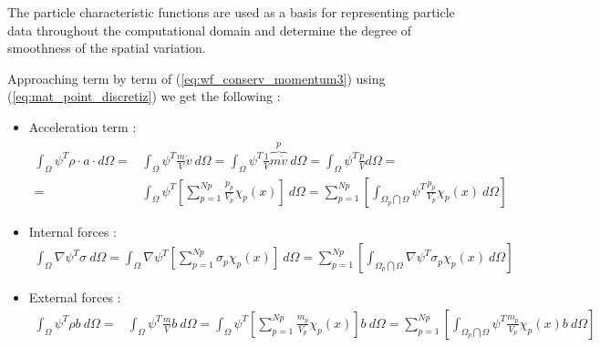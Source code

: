 The particle characteristic functions are used as a basis for
representing particle data throughout the computational domain and
determine the degree of smoothness of the spatial variation.

Approaching term by term of (\ref{eq:wf_conserv_momentum3}) using
(\ref{eq:mat_point_discretiz}) we get the following :



\begin{itemize}
\item Acceleration term :
  \begin{eqnarray}
    \label{eq:wf_conserv_momentum_acc}
   \int_{\Omega} \psi^T \rho \cdot a \cdot d\Omega =& \int_{\Omega} \psi^T \frac{m}{V}
                                                     \dot{v}\ d\Omega = \int_{\Omega} \psi^T \frac{1}{V}
                                                     \overbrace{m\dot{v}}^{\dot{p}}\ d\Omega = \int_{\Omega} \psi^T \frac{\dot{p}}{V} d\Omega = \nonumber \\
  =&  \int_{\Omega} \psi^T \left[ \sum^{Np}_{p=1} \frac{\dot{p}_p}{V_p} \chi_p(x) \right]\ d\Omega =
     \sum^{Np}_{p=1} \left[ \int_{\Omega_p \bigcap \Omega}
     \psi^T\frac{\dot{p}_p}{V_p}\chi_p(x)\ d\Omega \right] 
  \end{eqnarray}


\item Internal forces :
  \begin{align}
    \label{eq:wf_conserv_momentum_int_forces}
    \int_{\Omega}  \nabla \psi^T \sigma\ d\Omega = \int_{\Omega}  \nabla
    \psi^T \left[\sum^{Np}_{p=1} \sigma_p \chi_p(x) \right]\ d\Omega =
    \sum^{Np}_{p=1} \left[ \int_{\Omega_p \bigcap \Omega}
    \nabla\psi^T\sigma_p\chi_p(x)\ d\Omega \right]
  \end{align}
\item External forces :
  \begin{align}
    \label{eq:wf_conserv_momentum_ext_forces}
    \int_{\Omega} \psi^T \rho b\ d\Omega =& \int_{\Omega} \psi^T \frac{m}{V} b\
                                           d\Omega = \int_{\Omega} \psi^T \left[ \sum^{Np}_{p=1}
                                           \frac{m_p}{V_p}\chi_p(x) \right] b\ d\Omega = \sum_{p=1}^{Np}
                                           \left[ \int_{\Omega_p \bigcap \Omega}
                                           \psi^T \frac{m_p}{V_p} \chi_p(x) b\ d\Omega \right]
  \end{align}  
\end{itemize}

